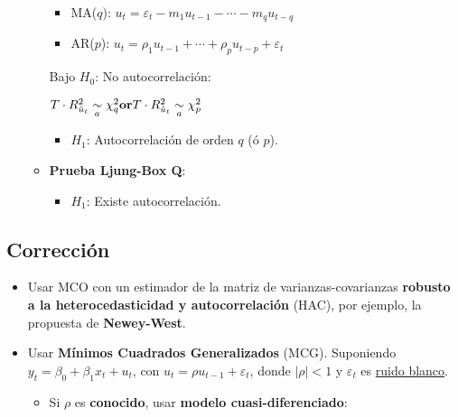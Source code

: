 \documentclass[10pt, a4paper, landscape]{article}
\begin{document}
\begin{multicols}{3}
\begin{itemize}[leftmargin=*]
\begin{itemize}[leftmargin=*]
				\begin{itemize}[leftmargin=*]
					\item MA($q$): $u_{t} = \varepsilon_{t} - m_{1} u_{t - 1} - \cdots - m_{q} u_{t - q}$
					\item AR($p$): $u_{t} = \rho_{1} u_{t - 1} + \cdots + \rho_{p} u_{t - p}+ \varepsilon_{t}$
				\end{itemize}
				
			\columnbreak
				
				Bajo $H_{0}$: No autocorrelación:
				
				\begin{center}
					$\hfill T \cdot R^{2}_{\hat{u}_t}\underset{a}{\sim}\chi^{2}_{q} \hfill \textbf{or} \hfill T \cdot R^{2}_{\hat{u}_t}\underset{a}{\sim}\chi^{2}_{p} \hfill$
				\end{center}
				
				\begin{itemize}[leftmargin=*]
					\item $H_{1}$: Autocorrelación de orden $q$ (ó $p$).
				\end{itemize}
				
				\item \textbf{Prueba Ljung-Box Q}:
				
				\begin{itemize}[leftmargin=*]
					\item $H_{1}$: Existe autocorrelación.
				\end{itemize}
			\end{itemize}
		\end{itemize}
		
		\subsection*{Corrección}
		
		\begin{itemize}[leftmargin=*]
			\item Usar MCO con un estimador de la matriz de varianzas-covarianzas \textbf{robusto a la heterocedasticidad y autocorrelación} (HAC), por ejemplo, la propuesta de \textbf{Newey-West}.
			\item Usar \textbf{Mínimos Cuadrados Generalizados} (MCG). Suponiendo $y_{t} = \beta_{0} + \beta_{1} x_{t} + u_{t}$, con $u_{t} = \rho u_{t - 1}+ \varepsilon_{t}$, donde $\lvert \rho \rvert < 1$ y $\varepsilon_{t}$ es \underline{ruido blanco}.
			
			\begin{itemize}[leftmargin=*]
				\item Si $\rho$ es \textbf{conocido}, usar \textbf{modelo cuasi-diferenciado}:
			

\end{itemize}
\end{itemize}
\end{multicols}
\end{document}
